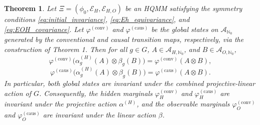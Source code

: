 \documentclass[10pt,a4paper]{amsart}
\newtheorem{theorem}{Theorem}
\begin{document}
\begin{theorem}\label{thm:global_invariance}
Let \(\Xi = (\phi_0, \mathcal{E}_H, \mathcal{E}_{H,O})\) be an HQMM satisfying the symmetry conditions \eqref{eq:initial_invariance}, \eqref{eq:Eh_equivariance}, and \eqref{eq:EOH_covariance}. Let \(\varphi^{(\text{conv})}\) and \(\varphi^{(\text{caus})}\) be the global states on \(\mathcal{A}_{\mathbb{N}_0}\) generated by the conventional and causal transition maps, respectively, via the construction of Theorem 1. Then for all \(g \in G\), \(A \in \mathcal{A}_{H,\mathbb{N}_0}\), and \(B \in \mathcal{A}_{O,\mathbb{N}_0}\),
\begin{equation}
\varphi^{(\text{conv})}\big( \alpha_g^{(H)}(A) \otimes \beta_g(B) \big) = \varphi^{(\text{conv})}(A \otimes B),
\label{eq:global_conv_invariance}
\end{equation}
\begin{equation}
\varphi^{(\text{caus})}\big( \alpha_g^{(H)}(A) \otimes \beta_g(B) \big) = \varphi^{(\text{caus})}(A \otimes B).
\label{eq:global_caus_invariance}
\end{equation}
In particular, both global states are invariant under the combined projective-linear action of \(G\). Consequently, the hidden marginals \(\varphi_H^{(\text{conv})}\) and \(\varphi_H^{(\text{caus})}\) are invariant under the projective action \(\alpha^{(H)}\), and the observable marginals \(\varphi_O^{(\text{conv})}\) and \(\varphi_O^{(\text{caus})}\) are invariant under the linear action \(\beta\).
\end{theorem}
\end{document}

